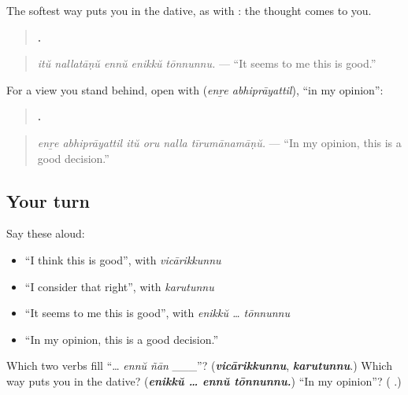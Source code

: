 \begin{grammarlens}[title={Grammar Lens: \ml{എനിക്ക്} … \ml{എന്ന്} \ml{തോന്നുന്നു}}]
The softest way puts you in the dative, as with \textbf{ }: the thought comes to you.

\begin{quote}
\textbf{    .}
\end{quote}

\begin{quote}
\emph{itŭ nallatāṇŭ ennŭ enikkŭ tōnnunnu.} — \textquotedblleft{}It seems to me this is good.\textquotedblright{}
\end{quote}

For a view you stand behind, open with \textbf{ } (\emph{enṟe abhiprāyattil}), \textquotedblleft{}in my opinion\textquotedblright{}:

\begin{quote}
\textbf{     .}
\end{quote}

\begin{quote}
\emph{enṟe abhiprāyattil itŭ oru nalla tīrumānamāṇŭ.} — \textquotedblleft{}In my opinion, this is a good decision.\textquotedblright{}
\end{quote}
\end{grammarlens}

\subsection*{Your turn}
Say these aloud:

\begin{itemize}
\raggedright
  \item \textquotedblleft{}I think this is good\textquotedblright{}, with \emph{vicārikkunnu}
  \item \textquotedblleft{}I consider that right\textquotedblright{}, with \emph{karutunnu}
  \item \textquotedblleft{}It seems to me this is good\textquotedblright{}, with \emph{enikkŭ … tōnnunnu}
  \item \textquotedblleft{}In my opinion, this is a good decision.\textquotedblright{}
\end{itemize}

\begin{tcolorbox}[breakable,colback=teal!4,colframe=teal!35!black,title={Before you move on}]
Which two verbs fill \textquotedblleft{}… \emph{ennŭ ñān} \_\_\_\textquotedblright{}? (\emph{\textbf{vicārikkunnu}}, \emph{\textbf{karutunnu}}.) Which way puts you in the dative? (\emph{\textbf{enikkŭ … ennŭ tōnnunnu.}}) \textquotedblleft{}In my opinion\textquotedblright{}? (\textbf{ }.)
\end{tcolorbox}
